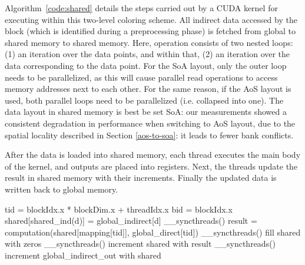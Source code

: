 Algorithm~\ref{code:shared} details the steps carried out by a CUDA kernel for 
executing within this two-level coloring scheme. All indirect data accessed 
by the block (which is identified during a preprocessing phase) is fetched from 
global to shared memory to shared memory. Here, operation consists of two 
nested loops: (1) an iteration over the data points, and within that, (2) an 
iteration over the data corresponding to the data point. For the SoA layout, 
only the outer loop needs to be parallelized, as this will cause parallel 
read operations to access memory addresses next to each other. For the same 
reason, if the AoS layout is used, both parallel loops need to be parallelized
(i.e. collapsed into one). The data layout in shared memory is best be set SoA: 
our measurements showed a consistent degradation in performance when switching 
to AoS layout, due to the spatial locality described in Section 
\ref{aos-to-soa}: it leads to fewer bank conflicts.

After the data is loaded into shared memory, each thread executes the main body 
of the kernel, and outputs are placed into registers.  Next, the threads update 
the result in shared memory with their increments. Finally the updated data is 
written back to global memory.

\begin{algorithm}
  \begin{algorithmic}
    \State tid = blockIdx.x * blockDim.x + threadIdx.x
    \State bid = blockIdx.x
      \State shared[shared\_ind(d)] = global\_indirect[d]
    \EndFor
    \State \_\_syncthreads()
    \State result = computation(shared[mapping[tid]], global\_direct[tid])
    \State \_\_syncthreads()
    \State fill shared with zeros
    \State \_\_syncthreads()
        \State increment shared with result
      \EndIf
      \State \_\_syncthreads()
    \EndFor
      \State increment global\_indirect\_out with shared
    \EndFor
  \end{algorithmic}
  \caption{Algorithm to use the shared memory to preload indirect data accessed
  within a thread block. \lstinline!global_indirect! holds the data indirectly
  read, \lstinline!global_indirect_out! holds the result of the iteration.}
  \label{code:shared}
\end{algorithm}

